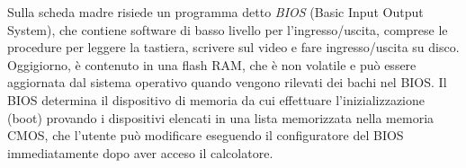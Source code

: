  Sulla scheda madre risiede un programma detto \textit{BIOS} (Basic Input Output System), che contiene software di basso livello per l'ingresso/uscita, comprese le procedure per leggere la tastiera, scrivere sul video e fare ingresso/uscita su disco. Oggigiorno, è contenuto in una flash RAM, che è non volatile e può essere aggiornata dal sistema operativo quando vengono rilevati dei bachi nel BIOS. Il BIOS determina il dispositivo di memoria da cui effettuare l'inizializzazione (boot) provando i dispositivi elencati in una lista memorizzata nella memoria CMOS, che l'utente può modificare eseguendo il configuratore del BIOS immediatamente dopo aver acceso il calcolatore.



